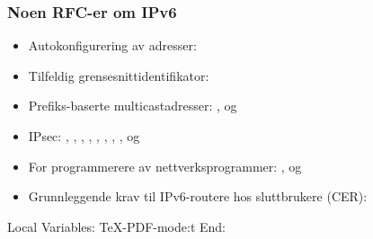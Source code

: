\begin{frame}%
  \frametitle{Noen RFC-er om IPv6}
  \begin{itemize}%
  \item Autokonfigurering av adresser: 
  \item Tilfeldig grensesnittidentifikator: 
  \item Prefiks-baserte multicastadresser: ,  og
  \item IPsec: , , , ,
    , , , ,  og
  \item For programmerere av nettverksprogrammer: ,
     og 
  \item Grunnleggende krav til IPv6-routere hos sluttbrukere (CER):
  \end{itemize}
\end{frame}



Local Variables:
TeX-PDF-mode:t
End:
